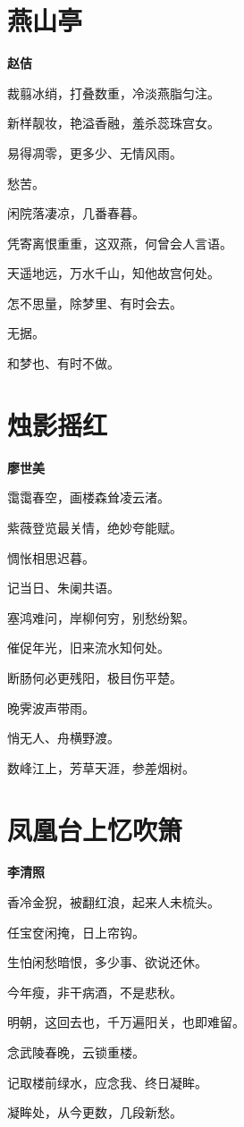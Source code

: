 \documentclass[12pt,a4paper]{ctexbook}
\begin{document}
\section{燕山亭}
\textbf{赵佶}\par\vspace{0.5em}
裁翦冰绡，打叠数重，冷淡燕脂匀注。\par
新样靓妆，艳溢香融，羞杀蕊珠宫女。\par
易得凋零，更多少、无情风雨。\par
愁苦。\par
闲院落凄凉，几番春暮。\par
凭寄离恨重重，这双燕，何曾会人言语。\par
天遥地远，万水千山，知他故宫何处。\par
怎不思量，除梦里、有时会去。\par
无据。\par
和梦也、有时不做。\par

\section{烛影摇红}
\textbf{廖世美}\par\vspace{0.5em}
霭霭春空，画楼森耸凌云渚。\par
紫薇登览最关情，绝妙夸能赋。\par
惆怅相思迟暮。\par
记当日、朱阑共语。\par
塞鸿难问，岸柳何穷，别愁纷絮。\par
催促年光，旧来流水知何处。\par
断肠何必更残阳，极目伤平楚。\par
晚霁波声带雨。\par
悄无人、舟横野渡。\par
数峰江上，芳草天涯，参差烟树。\par

\section{凤凰台上忆吹箫}
\textbf{李清照}\par\vspace{0.5em}
香冷金猊，被翻红浪，起来人未梳头。\par
任宝奁闲掩，日上帘钩。\par
生怕闲愁暗恨，多少事、欲说还休。\par
今年瘦，非干病酒，不是悲秋。\par
明朝，这回去也，千万遍阳关，也即难留。\par
念武陵春晚，云锁重楼。\par
记取楼前绿水，应念我、终日凝眸。\par
凝眸处，从今更数，几段新愁。\par
\end{document}

